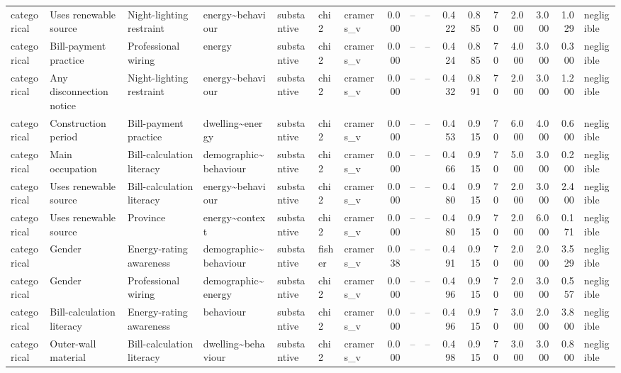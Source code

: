 \begin{table}
\begin{tabular}{lllllllrrrrrrrrrl}
categorical & Uses renewable source & Night-lighting restraint & energy\textasciitilde behaviour & substantive & chi2 & cramers\_v & 0.000 & -- & -- & 0.422 & 0.885 & 70 & 2.000 & 3.000 & 1.029 & negligible \\
categorical & Bill-payment practice & Professional wiring & energy & substantive & chi2 & cramers\_v & 0.000 & -- & -- & 0.424 & 0.885 & 70 & 4.000 & 3.000 & 0.300 & negligible \\
categorical & Any disconnection notice & Night-lighting restraint & energy\textasciitilde behaviour & substantive & chi2 & cramers\_v & 0.000 & -- & -- & 0.432 & 0.891 & 70 & 2.000 & 3.000 & 1.200 & negligible \\
categorical & Construction period & Bill-payment practice & dwelling\textasciitilde energy & substantive & chi2 & cramers\_v & 0.000 & -- & -- & 0.453 & 0.915 & 70 & 6.000 & 4.000 & 0.600 & negligible \\
categorical & Main occupation & Bill-calculation literacy & demographic\textasciitilde behaviour & substantive & chi2 & cramers\_v & 0.000 & -- & -- & 0.466 & 0.915 & 70 & 5.000 & 3.000 & 0.200 & negligible \\
categorical & Uses renewable source & Bill-calculation literacy & energy\textasciitilde behaviour & substantive & chi2 & cramers\_v & 0.000 & -- & -- & 0.480 & 0.915 & 70 & 2.000 & 3.000 & 2.400 & negligible \\
categorical & Uses renewable source & Province & energy\textasciitilde context & substantive & chi2 & cramers\_v & 0.000 & -- & -- & 0.480 & 0.915 & 70 & 2.000 & 6.000 & 0.171 & negligible \\
categorical & Gender & Energy-rating awareness & demographic\textasciitilde behaviour & substantive & fisher & cramers\_v & 0.038 & -- & -- & 0.491 & 0.915 & 70 & 2.000 & 2.000 & 3.529 & negligible \\
categorical & Gender & Professional wiring & demographic\textasciitilde energy & substantive & chi2 & cramers\_v & 0.000 & -- & -- & 0.496 & 0.915 & 70 & 2.000 & 3.000 & 0.557 & negligible \\
categorical & Bill-calculation literacy & Energy-rating awareness & behaviour & substantive & chi2 & cramers\_v & 0.000 & -- & -- & 0.496 & 0.915 & 70 & 3.000 & 2.000 & 3.800 & negligible \\
categorical & Outer-wall material & Bill-calculation literacy & dwelling\textasciitilde behaviour & substantive & chi2 & cramers\_v & 0.000 & -- & -- & 0.498 & 0.915 & 70 & 3.000 & 3.000 & 0.800 & negligible \\

\end{tabular}
\end{table}
